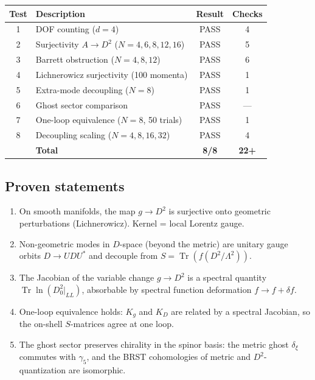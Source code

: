 \documentclass[12pt,a4paper]{article}
\newcommand{\Tr}{\operatorname{Tr}}
\newcommand{\Lam}{\Lambda}
\theoremstyle{definition}
\theoremstyle{remark}
\begin{document}
\begin{center}
\begin{tabular}{clcc}
\toprule
Test & Description & Result & Checks \\
\midrule
1 & DOF counting ($d = 4$) & PASS & 4 \\
2 & Surjectivity $A \to D^2$ ($N = 4,6,8,12,16$) & PASS & 5 \\
3 & Barrett obstruction ($N = 4,8,12$) & PASS & 6 \\
4 & Lichnerowicz surjectivity (100 momenta) & PASS & 1 \\
5 & Extra-mode decoupling ($N = 8$) & PASS & 1 \\
6 & Ghost sector comparison & PASS & --- \\
7 & One-loop equivalence ($N = 8$, 50 trials) & PASS & 1 \\
8 & Decoupling scaling ($N = 4,8,16,32$) & PASS & 4 \\
\midrule
  & \textbf{Total} & \textbf{8/8} & \textbf{22+} \\
\bottomrule
\end{tabular}
\end{center}

\subsection{Proven statements}

\begin{enumerate}
  \item On smooth manifolds, the map $g \to D^2$ is surjective onto
    geometric perturbations (Lichnerowicz).  Kernel = local Lorentz gauge.
  \item Non-geometric modes in $D$-space (beyond the metric) are unitary
    gauge orbits $D \to UDU^*$ and decouple from $S = \Tr(f(D^2/\Lam^2))$.
  \item The Jacobian of the variable change $g \to D^2$ is a spectral
    quantity $\Tr\ln(D_0^2|_{LL})$, absorbable by spectral function
    deformation $f \to f + \delta f$.
  \item One-loop equivalence holds: $K_g$ and $K_D$ are related by a
    spectral Jacobian, so the on-shell $S$-matrices agree at one loop.
  \item The ghost sector preserves chirality in the spinor basis: the
    metric ghost $\delta_\xi$ commutes with $\gamma_5$, and the BRST
    cohomologies of metric and $D^2$-quantization are isomorphic.
\end{enumerate}
\end{document}
